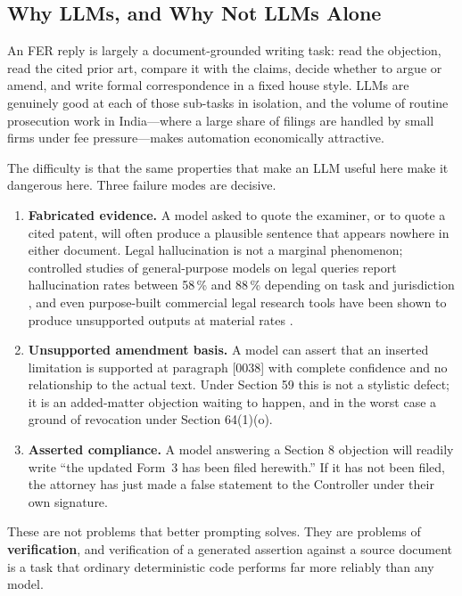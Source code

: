 \documentclass[conference]{IEEEtran}
\begin{document}
\subsection{Why LLMs, and Why Not LLMs Alone}

An FER reply is largely a document-grounded writing task: read the objection, read the cited prior art, compare it with the claims, decide whether to argue or amend, and write formal correspondence in a fixed house style. LLMs are genuinely good at each of those sub-tasks in isolation, and the volume of routine prosecution work in India---where a large share of filings are handled by small firms under fee pressure---makes automation economically attractive.

The difficulty is that the same properties that make an LLM useful here make it dangerous here. Three failure modes are decisive.

\begin{enumerate}
\item \textbf{Fabricated evidence.} A model asked to quote the examiner, or to quote a cited patent, will often produce a plausible sentence that appears nowhere in either document. Legal hallucination is not a marginal phenomenon; controlled studies of general-purpose models on legal queries report hallucination rates between 58\,\% and 88\,\% depending on task and jurisdiction \cite{dahl2024}, and even purpose-built commercial legal research tools have been shown to produce unsupported outputs at material rates \cite{magesh2025}.
\item \textbf{Unsupported amendment basis.} A model can assert that an inserted limitation is supported at paragraph [0038] with complete confidence and no relationship to the actual text. Under Section 59 this is not a stylistic defect; it is an added-matter objection waiting to happen, and in the worst case a ground of revocation under Section 64(1)(o).
\item \textbf{Asserted compliance.} A model answering a Section 8 objection will readily write ``the updated Form~3 has been filed herewith.'' If it has not been filed, the attorney has just made a false statement to the Controller under their own signature.
\end{enumerate}

These are not problems that better prompting solves. They are problems of \textbf{verification}, and verification of a generated assertion against a source document is a task that ordinary deterministic code performs far more reliably than any model.
\end{document}

